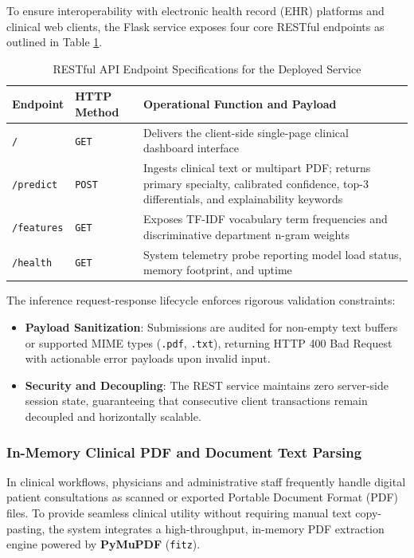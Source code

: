 To ensure interoperability with electronic health record (EHR) platforms and clinical web clients, the Flask service exposes four core RESTful endpoints as outlined in Table \ref{tab:api_endpoints}.

\begin{table}[H]
\centering
\small
\begin{tabularx}{\linewidth}{|l|l|X|}
\hline
\textbf{Endpoint} & \textbf{HTTP Method} & \textbf{Operational Function and Payload} \\
\hline
\texttt{/} & \texttt{GET} & Delivers the client-side single-page clinical dashboard interface \\
\hline
\texttt{/predict} & \texttt{POST} & Ingests clinical text or multipart PDF; returns primary specialty, calibrated confidence, top-3 differentials, and explainability keywords \\
\hline
\texttt{/features} & \texttt{GET} & Exposes TF-IDF vocabulary term frequencies and discriminative department n-gram weights \\
\hline
\texttt{/health} & \texttt{GET} & System telemetry probe reporting model load status, memory footprint, and uptime \\
\hline
\end{tabularx}
\caption{RESTful API Endpoint Specifications for the Deployed Service}
\label{tab:api_endpoints}
\end{table}

The inference request-response lifecycle enforces rigorous validation constraints:
\begin{itemize}
    \item \textbf{Payload Sanitization}: Submissions are audited for non-empty text buffers or supported MIME types (\texttt{.pdf}, \texttt{.txt}), returning HTTP 400 Bad Request with actionable error payloads upon invalid input.
    \item \textbf{Security and Decoupling}: The REST service maintains zero server-side session state, guaranteeing that consecutive client transactions remain decoupled and horizontally scalable.
\end{itemize}

\subsubsection{In-Memory Clinical PDF and Document Text Parsing}

In clinical workflows, physicians and administrative staff frequently handle digital patient consultations as scanned or exported Portable Document Format (PDF) files. To provide seamless clinical utility without requiring manual text copy-pasting, the system integrates a high-throughput, in-memory PDF extraction engine powered by \textbf{PyMuPDF} (\texttt{fitz}).

